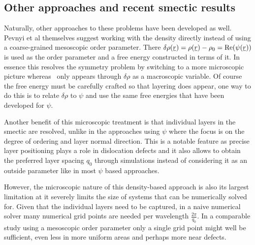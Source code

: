 \documentclass[12pt]{article}
\newcommand{\suf}[2]{\stackunder[0.5pt]{\stackunder[1pt]{\ensuremath{#1}}{\rule{\widthof{\ensuremath{#2}}*\real{0.9}}{.1ex}}}{}}
\newcommand{\su}[1]{\suf{#1}{#1}}
\newcommand{\NN}{\su{N}}
\begin{document}
\subsection{Other approaches and recent smectic results}
Naturally, other approaches to these problems have been developed as well.
Pevnyi et al themselves suggest working with the density directly instead of using a coarse-grained mesoscopic order parameter\cite{pevnyiModelingSmecticLayers2014,xiaStructuralLandscapesGeometrically2021,farrellFiniteelementDiscretizationSmectic2023,xiaSimpleTensorialTheory2024}.
There $\delta\rho(\su{r}) = \rho(\su{r}) - \rho_0 = \Re(\psi(\su{r}))$ is used as the order parameter and a free energy constructed in terms of it.
In essence this resolves the symmetry problem by switching to a more microscopic picture whereas \NN\ only appears through $\delta\rho$ as a macroscopic variable.
Of course the free energy must be carefully crafted so that layering does appear, one way to do this is to relate $\delta\rho$ to $\psi$ and use the same free energies that have been developed for $\psi$\cite{pevnyiModelingSmecticLayers2014}.

Another benefit of this microscopic treatment is that individual layers in the smectic are resolved, unlike in the approaches using $\psi$ where the focus is on the degree of ordering and layer normal direction.
This is a notable feature as precise layer positioning plays a role in dislocation defects  and it also allows to obtain the preferred layer spacing $q_0$ through simulations instead of considering it as an outside parameter like in most $\psi$ based approaches.

However, the microscopic nature of this density-based approach is also its largest limitation at it severely limits the size of systems that can be numerically solved for.
Given that the individual layers need to be captured, in a naive numerical solver many numerical grid points are needed per wavelength $\frac{2\pi}{q_0}$.
In a comparable study using a mesoscopic order parameter only a single grid point might well be sufficient, even less in more uniform areas and perhaps more near defects.
\end{document}
